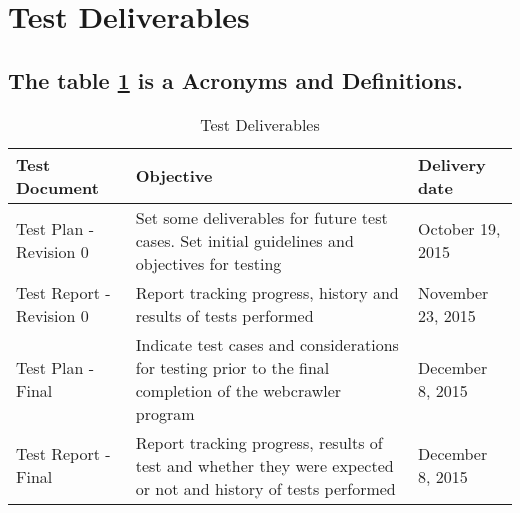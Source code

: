 \documentclass[12pt]{article}
\begin{document}
 \section{Test Deliverables}
 \begin{table}[h!]
\subsection{The table \ref {table:Test Deliverables} is a Acronyms and Definitions.}
    \begin{tabular}{| p{5cm} | p{5cm} | p{5cm} |}    \hline
    
Test Document&Objective&Delivery date\\ \hline
Test Plan - Revision 0&Set some deliverables for future test cases. Set initial guidelines and objectives for testing&October 19, 2015\\ \hline
Test Report -Revision 0&Report tracking progress, history and results of tests performed&November 23, 2015\\ \hline
Test Plan -Final&Indicate test cases and considerations for testing prior to the final completion of the webcrawler program&December 8, 2015\\ \hline
Test Report - Final&Report tracking progress, results of test and whether they were expected or not and history of tests performed&December 8, 2015\\ \hline

\end{tabular}
    \caption{Test Deliverables}
\label{table:Test Deliverables}
\end{table}
\end{document}
